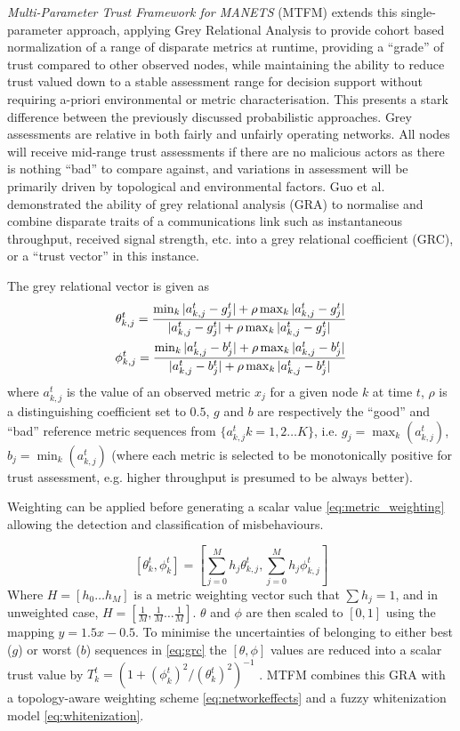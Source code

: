 \documentclass{aamas2016}
\begin{document}
\textit{Multi-Parameter Trust Framework for MANETS} (MTFM) extends this single-parameter approach, applying Grey Relational Analysis \cite{Zuo1995} to provide cohort based normalization of a range of disparate metrics at runtime, providing a “grade” of trust compared to other observed nodes, while maintaining the ability to reduce trust valued down to a stable assessment range for decision support without requiring a-priori environmental or metric characterisation. This presents a stark difference between the previously discussed probabilistic approaches. Grey assessments are relative in both fairly and unfairly operating networks. All nodes will receive mid-range trust assessments if there are no malicious actors as there is nothing ``bad'' to compare against, and variations in assessment will be primarily driven by topological and environmental factors.
Guo et al. \cite{Guo11} demonstrated the ability of grey relational analysis (GRA) \cite{Zuo1995} to normalise and combine disparate traits of a communications link such as instantaneous throughput, received signal strength, etc. into a grey relational coefficient (GRC), or a ``trust vector'' in this instance.

The grey relational vector is given as
%
\begin{align}
\label{eq:grc}
\theta_{k,j}^t = \frac{\min_k|a_{k,j}^t - g_j^t| + \rho \max_k|a_{k,j}^t-g_j^t|}{|a_{k,j}^t-g_j^t| + \rho \max_k|a_{k,j}^t-g_j^t|} \\
\phi_{k,j}^t = \frac{\min_k|a_{k,j}^t - b_j^t| + \rho \max_k|a_{k,j}^t-b_j^t|}{|a_{k,j}^t-b_j^t| + \rho \max_k|a_{k,j}^t-b_j^t|} \notag 
\end{align}
%
where $a_{k,j}^t$ is the value of an observed metric $x_j$ for a given node $k$ at time $t$, $\rho$ is a distinguishing coefficient set to $0.5$, $g$ and $b$ are respectively the ``good'' and ``bad'' reference metric sequences from $\{a_{k,j}^t k=1,2\dots K\}$, i.e. $g_j=\max_k({a_{k,j}^t})$,  $b_j=\min_k({a_{k,j}^t})$ (where each metric is selected to be monotonically positive for trust assessment, e.g. higher throughput is presumed to be always better). 

Weighting can be applied before generating a scalar value \eqref{eq:metric_weighting} allowing the detection and classification of misbehaviours.

%
\begin{equation}
\label{eq:metric_weighting}
[\theta_k^t, \phi_k^t] = \left[\sum_{j=0}^M h_j \theta_{k,j}^t,\sum_{j=0}^M h_j \phi_{k,j}^t \right]
\end{equation}
%
Where $H=[h_0\dots h_M]$ is a metric weighting vector such that $\sum h_j = 1$, and in unweighted case, $H=[\frac{1}{M},\frac{1}{M}\dots\frac{1}{M}]$.
$\theta$ and $\phi$ are then scaled to $[0,1]$ using the mapping $y = 1.5 x - 0.5$.
To minimise the uncertainties of belonging to either best ($g$) or worst ($b$) sequences in \eqref{eq:grc} the $[\theta,\phi]$ values are reduced into a scalar trust value by $T_k^t = ({1+{(\phi_k^t)^2}/{(\theta_k^t)^2}})^{-1}$ \cite{Hong2010}.
MTFM combines this GRA with a topology-aware weighting scheme \eqref{eq:networkeffects} and a fuzzy whitenization model \eqref{eq:whitenization}. 
\end{document}
